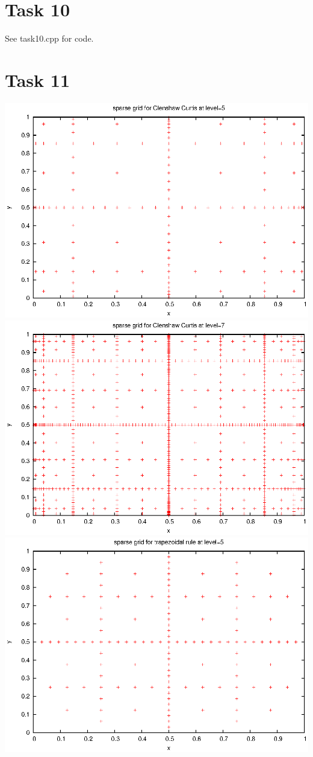 \documentclass[]{article}
\begin{document}
\section*{Task 10}
See task10.cpp for code.

\section*{Task 11}
\includegraphics[width=.9\textwidth]{task11_cc5}\\
\includegraphics[width=.9\textwidth]{task11_cc7}\\
\includegraphics[width=.9\textwidth]{task11_trap_5}\\
\end{document}
